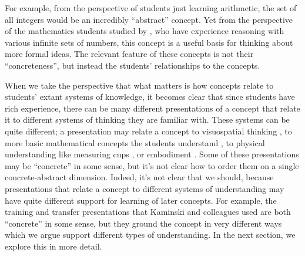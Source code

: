 \documentclass[man,10pt]{apa6}
\begin{document}
For example, from the perspective of students just learning arithmetic, the set of all integers would be an incredibly ``abstract'' concept. Yet from the perspective of the mathematics students studied by , who have experience reasoning with various infinite sets of numbers, this concept is a useful basis for thinking about more formal ideas. The relevant feature of these concepts is not their ``concreteness'', but instead the students' relationships to the concepts.\par 
When we take the perspective that what matters is how concepts relate to students' extant systems of knowledge, it becomes clear that since students have rich experience, there can be many different presentations of a concept that relate it to different systems of thinking they are familiar with. These systems can be quite different; a presentation may relate a concept to visuospatial thinking \cite{Rau2016}, to more basic mathematical concepts the students understand \cite{Hazzan1999}, to physical understanding like measuring cups \cite{Kaminski2008}, or embodiment \cite{Nathan2008}. Some of these presentations may be ``concrete'' in some sense, but it's not clear how to order them on a single concrete-abstract dimension. Indeed, it's not clear that we should, because presentations that relate a concept to different systems of understanding may have quite different support for learning of later concepts. For example, the training and transfer presentations that Kaminski and colleagues used are both ``concrete'' in some sense, but they ground the concept in very different ways which we argue support different types of understanding. In the next section, we explore this in more detail.\par 
\end{document}
